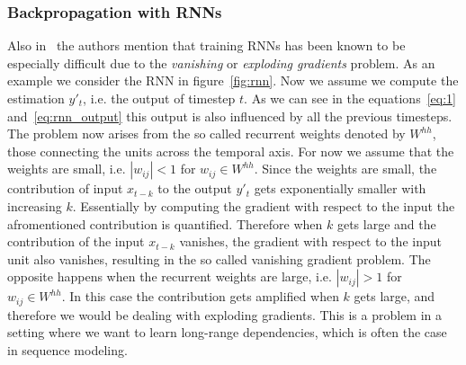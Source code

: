 \subsubsection{Backpropagation with RNNs}
Also in~\cite{rnn_survey} the authors mention that training RNNs has been known to be especially difficult due to the \emph{vanishing} or \emph{exploding gradients} problem.
As an example we consider the RNN in figure~\ref{fig:rnn}.
Now we assume we compute the estimation $y'_t$, i.e. the output of timestep $t$.
As we can see in the equations~\ref{eq:1} and~\ref{eq:rnn_output} this output is also influenced by all the previous timesteps.
The problem now arises from the so called recurrent weights denoted by $W^{hh}$, those connecting the units across the temporal axis.
For now we assume that the weights are small, i.e. $|w_{ij}| < 1$ for $w_{ij} \in W^{hh}$.
Since the weights are small, the contribution of input $x_{t-k}$ to the output $y'_t$ gets exponentially smaller with increasing $k$.
Essentially by computing the gradient with respect to the input the afromentioned contribution is quantified.
Therefore when $k$ gets large and the contribution of the input $x_{t-k}$ vanishes, the gradient with respect to the input unit also vanishes, resulting in the so called vanishing gradient problem.
The opposite happens when the recurrent weights are large, i.e. $|w_{ij}| > 1$ for $w_{ij} \in W^{hh}$.
In this case the contribution gets amplified when $k$ gets large, and therefore we would be dealing with exploding gradients.
This is a problem in a setting where we want to learn long-range dependencies, which is often the case in sequence modeling.


